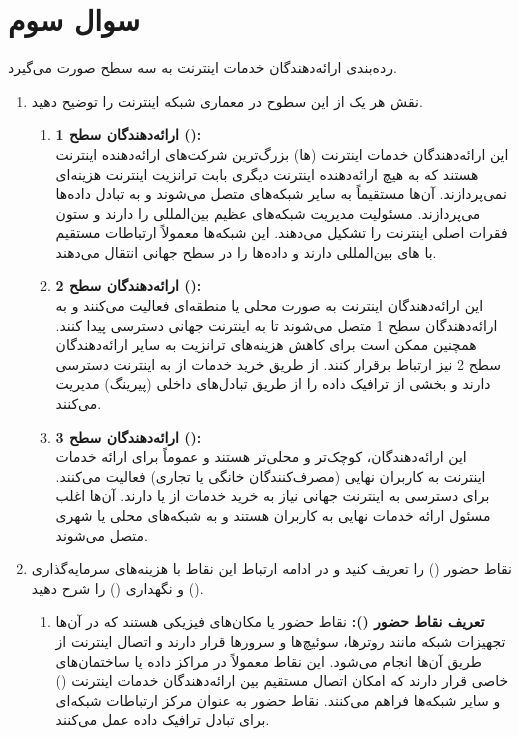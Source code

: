 \section{سوال سوم}
رده‌بندی ارائه‌دهندگان خدمات اینترنت به سه سطح  صورت می‌گیرد.

\begin{enumerate}
	\item 
	نقش هر یک از این سطوح در معماری شبکه اینترنت را توضیح دهید.
	\begin{qsolve}
		\begin{enumerate}
			\item 
			\textbf{ارائه‌دهندگان سطح 1 ():}\\
			این ارائه‌دهندگان خدمات اینترنت (ها) بزرگ‌ترین شرکت‌های ارائه‌دهنده اینترنت هستند که به هیچ ارائه‌دهنده اینترنت دیگری بابت ترانزیت اینترنت هزینه‌ای نمی‌پردازند. آن‌ها مستقیماً به سایر شبکه‌های  متصل می‌شوند و به تبادل داده‌ها می‌پردازند.  مسئولیت مدیریت شبکه‌های عظیم بین‌المللی را دارند و ستون فقرات اصلی اینترنت را تشکیل می‌دهند. این شبکه‌ها معمولاً ارتباطات مستقیم با های بین‌المللی دارند و داده‌ها را در سطح جهانی انتقال می‌دهند.
			
			
			\item 
			\textbf{ارائه‌دهندگان سطح 2 ():}\\
			این ارائه‌دهندگان اینترنت به صورت محلی یا منطقه‌ای فعالیت می‌کنند و به ارائه‌دهندگان سطح 1 متصل می‌شوند تا به اینترنت جهانی دسترسی پیدا کنند. همچنین ممکن است برای کاهش هزینه‌های ترانزیت به سایر ارائه‌دهندگان سطح 2 نیز ارتباط برقرار کنند.  از طریق خرید خدمات از  به اینترنت دسترسی دارند و بخشی از ترافیک داده را از طریق تبادل‌های داخلی (پیرینگ) مدیریت می‌کنند.
			
			\item 
			\textbf{ارائه‌دهندگان سطح 3 ():}\\
			این ارائه‌دهندگان، کوچک‌تر و محلی‌تر هستند و عموماً برای ارائه خدمات اینترنت به کاربران نهایی (مصرف‌کنندگان خانگی یا تجاری) فعالیت می‌کنند.  برای دسترسی به اینترنت جهانی نیاز به خرید خدمات از  یا  دارند. آن‌ها اغلب مسئول ارائه خدمات نهایی به کاربران هستند و به شبکه‌های محلی یا شهری متصل می‌شوند.
		\end{enumerate}
	\end{qsolve}
	
	
	\item 
	نقاط حضور () را تعریف کنید و در ادامه ارتباط این نقاط با هزینه‌های سرمایه‌گذاری () و نگهداری () را شرح دهید.
	\begin{qsolve}
		\begin{enumerate}
			\item 
			\textbf{تعریف نقاط حضور (\lr{PoP}):}
			نقاط حضور یا  مکان‌های فیزیکی هستند که در آن‌ها تجهیزات شبکه مانند روترها، سوئیچ‌ها و سرورها قرار دارند و اتصال اینترنت از طریق آن‌ها انجام می‌شود. این نقاط معمولاً در مراکز داده یا ساختمان‌های خاصی قرار دارند که امکان اتصال مستقیم بین ارائه‌دهندگان خدمات اینترنت () و سایر شبکه‌ها فراهم می‌کنند. نقاط حضور به عنوان مرکز ارتباطات شبکه‌ای برای تبادل ترافیک داده عمل می‌کنند.
			

\end{enumerate}
\end{qsolve}
\end{enumerate}
